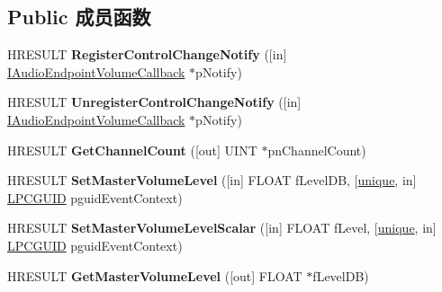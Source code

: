 \subsection*{Public 成员函数}
\begin{DoxyCompactItemize}
\item 
\mbox{\label{interface_i_audio_endpoint_volume_addfc54b0d5a5262df34fdf37c9f08f34}} 
H\+R\+E\+S\+U\+LT {\bfseries Register\+Control\+Change\+Notify} (\mbox{[}in\mbox{]} \hyperlink{interface_i_audio_endpoint_volume_callback}{I\+Audio\+Endpoint\+Volume\+Callback} $\ast$p\+Notify)
\item 
\mbox{\label{interface_i_audio_endpoint_volume_a4e7985f9b44e223053f58f2428702592}} 
H\+R\+E\+S\+U\+LT {\bfseries Unregister\+Control\+Change\+Notify} (\mbox{[}in\mbox{]} \hyperlink{interface_i_audio_endpoint_volume_callback}{I\+Audio\+Endpoint\+Volume\+Callback} $\ast$p\+Notify)
\item 
\mbox{\label{interface_i_audio_endpoint_volume_adb5a2c52c24162582e83a1a98d65c9b2}} 
H\+R\+E\+S\+U\+LT {\bfseries Get\+Channel\+Count} (\mbox{[}out\mbox{]} U\+I\+NT $\ast$pn\+Channel\+Count)
\item 
\mbox{\label{interface_i_audio_endpoint_volume_a8cafbfbfdf84d95317e38c20bdf2c847}} 
H\+R\+E\+S\+U\+LT {\bfseries Set\+Master\+Volume\+Level} (\mbox{[}in\mbox{]} F\+L\+O\+AT f\+Level\+DB, \mbox{[}\hyperlink{interfaceunique}{unique}, in\mbox{]} \hyperlink{interface_g_u_i_d}{L\+P\+C\+G\+U\+ID} pguid\+Event\+Context)
\item 
\mbox{\label{interface_i_audio_endpoint_volume_ae7d5ec0cfe6ca60612370c742b2208b1}} 
H\+R\+E\+S\+U\+LT {\bfseries Set\+Master\+Volume\+Level\+Scalar} (\mbox{[}in\mbox{]} F\+L\+O\+AT f\+Level, \mbox{[}\hyperlink{interfaceunique}{unique}, in\mbox{]} \hyperlink{interface_g_u_i_d}{L\+P\+C\+G\+U\+ID} pguid\+Event\+Context)
\item 
\mbox{\label{interface_i_audio_endpoint_volume_afb035f4bfd45792638e5997255a542bf}} 
H\+R\+E\+S\+U\+LT {\bfseries Get\+Master\+Volume\+Level} (\mbox{[}out\mbox{]} F\+L\+O\+AT $\ast$f\+Level\+DB)

\end{DoxyCompactItemize}
